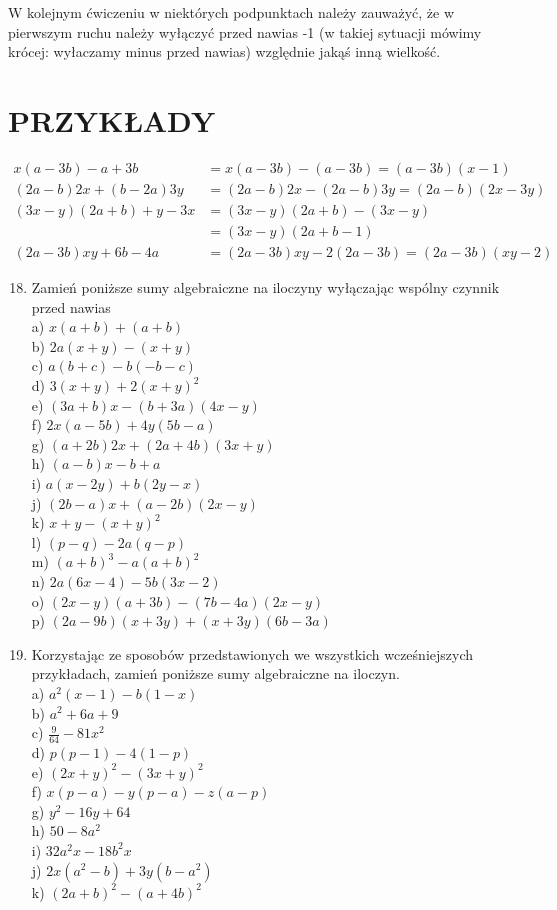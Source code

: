 \documentclass[10pt]{article}
\begin{document}
W kolejnym ćwiczeniu w niektórych podpunktach należy zauważyć, że w pierwszym ruchu należy wyłączyć przed nawias -1 (w takiej sytuacji mówimy krócej: wyłaczamy minus przed nawias) względnie jakąś inną wielkość.

\section*{PRZYKŁADY}
\[
\begin{aligned}
x(a-3 b)-a+3 b & =x(a-3 b)-(a-3 b)=(a-3 b)(x-1) \\
(2 a-b) 2 x+(b-2 a) 3 y & =(2 a-b) 2 x-(2 a-b) 3 y=(2 a-b)(2 x-3 y) \\
(3 x-y)(2 a+b)+y-3 x & =(3 x-y)(2 a+b)-(3 x-y) \\
& =(3 x-y)(2 a+b-1) \\
(2 a-3 b) x y+6 b-4 a & =(2 a-3 b) x y-2(2 a-3 b)=(2 a-3 b)(x y-2)
\end{aligned}
\]

\begin{enumerate}
  \setcounter{enumi}{17}
  \item Zamień poniższe sumy algebraiczne na iloczyny wyłączając wspólny czynnik przed nawias\\
a) \(x(a+b)+(a+b)\)\\
b) \(2 a(x+y)-(x+y)\)\\
c) \(a(b+c)-b(-b-c)\)\\
d) \(3(x+y)+2(x+y)^{2}\)\\
e) \((3 a+b) x-(b+3 a)(4 x-y)\)\\
f) \(2 x(a-5 b)+4 y(5 b-a)\)\\
g) \((a+2 b) 2 x+(2 a+4 b)(3 x+y)\)\\
h) \((a-b) x-b+a\)\\
i) \(a(x-2 y)+b(2 y-x)\)\\
j) \((2 b-a) x+(a-2 b)(2 x-y)\)\\
k) \(x+y-(x+y)^{2}\)\\
l) \((p-q)-2 a(q-p)\)\\
m) \((a+b)^{3}-a(a+b)^{2}\)\\
n) \(2 a(6 x-4)-5 b(3 x-2)\)\\
o) \((2 x-y)(a+3 b)-(7 b-4 a)(2 x-y)\)\\
p) \((2 a-9 b)(x+3 y)+(x+3 y)(6 b-3 a)\)
  \item Korzystając ze sposobów przedstawionych we wszystkich wcześniejszych przykładach, zamień poniższe sumy algebraiczne na iloczyn.\\
a) \(a^{2}(x-1)-b(1-x)\)\\
b) \(a^{2}+6 a+9\)\\
c) \(\frac{9}{64}-81 x^{2}\)\\
d) \(p(p-1)-4(1-p)\)\\
e) \((2 x+y)^{2}-(3 x+y)^{2}\)\\
f) \(x(p-a)-y(p-a)-z(a-p)\)\\
g) \(y^{2}-16 y+64\)\\
h) \(50-8 a^{2}\)\\
i) \(32 a^{2} x-18 b^{2} x\)\\
j) \(2 x\left(a^{2}-b\right)+3 y\left(b-a^{2}\right)\)\\
k) \((2 a+b)^{2}-(a+4 b)^{2}\)
\end{enumerate}
\end{document}

